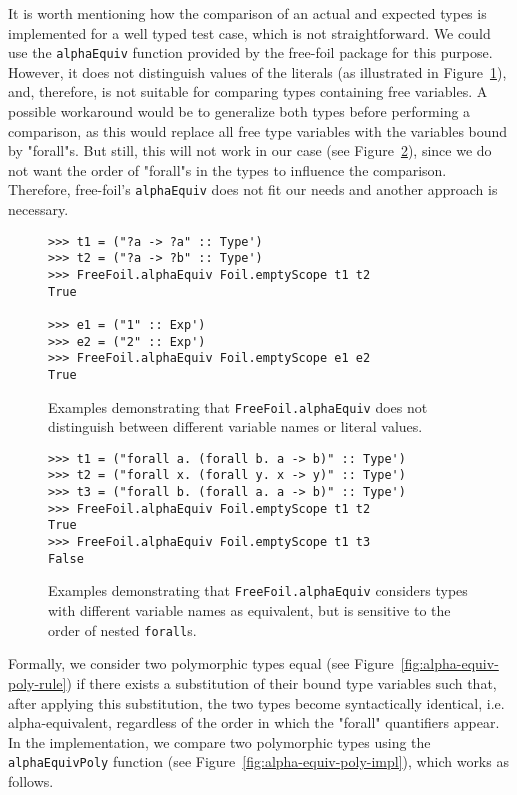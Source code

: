 It is worth mentioning how the comparison of an actual and expected types is implemented for a well typed test case, which is not straightforward. We could use the \texttt{alphaEquiv} function provided by the free-foil package for this purpose. However, it does not distinguish values of the literals (as illustrated in Figure~\ref{fig:freefoil-alphaequiv-literals}), and, therefore, is not suitable for comparing types containing free variables. A possible workaround would be to generalize both types before performing a comparison, as this would replace all free type variables with the variables bound by "forall"s. But still, this will not work in our case (see Figure~\ref{fig:freefoil-alphaequiv-foralls}), since we do not want the order of "forall"s in the types to influence the comparison. Therefore, free-foil's \texttt{alphaEquiv} does not fit our needs and another approach is necessary.

\begin{figure}[H]
  \begin{verbatim}
>>> t1 = ("?a -> ?a" :: Type')
>>> t2 = ("?a -> ?b" :: Type')
>>> FreeFoil.alphaEquiv Foil.emptyScope t1 t2
True

>>> e1 = ("1" :: Exp')
>>> e2 = ("2" :: Exp')
>>> FreeFoil.alphaEquiv Foil.emptyScope e1 e2
True
  \end{verbatim}
  \caption{Examples demonstrating that \texttt{FreeFoil.alphaEquiv} does not distinguish between different variable names or literal values.}
  \label{fig:freefoil-alphaequiv-literals}
\end{figure}

\begin{figure}[H]
  \begin{verbatim}
>>> t1 = ("forall a. (forall b. a -> b)" :: Type')
>>> t2 = ("forall x. (forall y. x -> y)" :: Type')
>>> t3 = ("forall b. (forall a. a -> b)" :: Type')
>>> FreeFoil.alphaEquiv Foil.emptyScope t1 t2
True
>>> FreeFoil.alphaEquiv Foil.emptyScope t1 t3
False
  \end{verbatim}
  \caption{Examples demonstrating that \texttt{FreeFoil.alphaEquiv} considers types with different variable names as equivalent, but is sensitive to the order of nested \texttt{forall}s.}
  \label{fig:freefoil-alphaequiv-foralls}
\end{figure}

Formally, we consider two polymorphic types equal (see Figure~\ref{fig:alpha-equiv-poly-rule}) if there exists a substitution of their bound type variables such that, after applying this substitution, the two types become syntactically identical, i.e. alpha-equivalent, regardless of the order in which the "forall" quantifiers appear. In the implementation, we compare two polymorphic types using the \texttt{alphaEquivPoly} function (see Figure~\ref{fig:alpha-equiv-poly-impl}), which works as follows.

